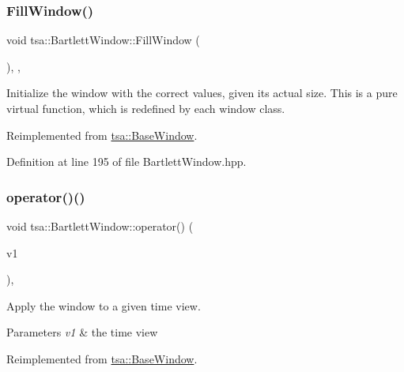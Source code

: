 \subsubsection{\texorpdfstring{Fill\+Window()}{FillWindow()}}
{\footnotesize\ttfamily void tsa\+::\+Bartlett\+Window\+::\+Fill\+Window (\begin{DoxyParamCaption}{ }\end{DoxyParamCaption})\hspace{0.3cm}{\ttfamily [inline]}, {\ttfamily [private]}, {\ttfamily [virtual]}}

Initialize the window with the correct values, given its actual size. This is a pure virtual function, which is redefined by each window class. 

Reimplemented from \hyperlink{classtsa_1_1_base_window_aa74b29105d94caa521d308198e8e6643}{tsa\+::\+Base\+Window}.



Definition at line 195 of file Bartlett\+Window.\+hpp.

\mbox{\label{classtsa_1_1_bartlett_window_a9bad239fb8fbaa295713c904e3d9d92e}} 
\subsubsection{\texorpdfstring{operator()()}{operator()()}\hspace{0.1cm}{\footnotesize\ttfamily [1/2]}}
{\footnotesize\ttfamily void tsa\+::\+Bartlett\+Window\+::operator() (\begin{DoxyParamCaption}\item[{\hyperlink{namespacetsa_ac599574bcc094eda25613724b8f3ca9e}{Seq\+View\+Double} \&}]{v1 }\end{DoxyParamCaption})\hspace{0.3cm}{\ttfamily [inline]}, {\ttfamily [virtual]}}

Apply the window to a given time view.


\begin{DoxyParams}{Parameters}
{\em v1} & the time view \\
\hline
\end{DoxyParams}


Reimplemented from \hyperlink{classtsa_1_1_base_window_a05d9edb95dc01840a1b2df78dfa3a8c1}{tsa\+::\+Base\+Window}.



